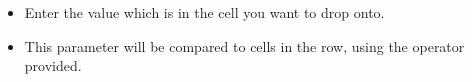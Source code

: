 
\begin{itemize}
\item Enter the value which is in the cell you want to drop onto.
\item This parameter will be compared to cells in the row, using the operator provided.
\end{itemize}
